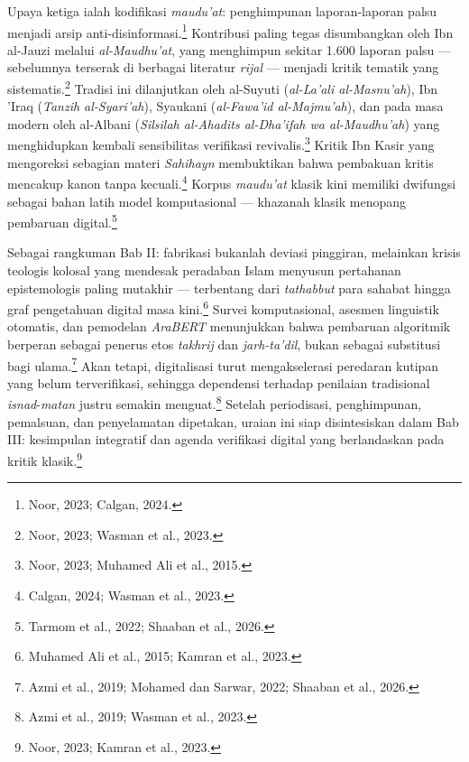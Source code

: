 Upaya ketiga ialah kodifikasi \textit{maudu'at}: penghimpunan laporan-laporan palsu menjadi arsip anti-disinformasi.\footnote{Noor, 2023; Calgan, 2024.} Kontribusi paling tegas disumbangkan oleh Ibn al-Jauzi melalui \textit{al-Maudhu'at}, yang menghimpun sekitar 1.600 laporan palsu --- sebelumnya terserak di berbagai literatur \textit{rijal} --- menjadi kritik tematik yang sistematis.\footnote{Noor, 2023; Wasman et al., 2023.} Tradisi ini dilanjutkan oleh al-Suyuti (\textit{al-La'ali al-Masnu'ah}), Ibn 'Iraq (\textit{Tanzih al-Syari'ah}), Syaukani (\textit{al-Fawa'id al-Majmu'ah}), dan pada masa modern oleh al-Albani (\textit{Silsilah al-Ahadits al-Dha'ifah wa al-Maudhu'ah}) yang menghidupkan kembali sensibilitas verifikasi revivalis.\footnote{Noor, 2023; Muhamed Ali et al., 2015.} Kritik Ibn Kasir yang mengoreksi sebagian materi \textit{Sahihayn} membuktikan bahwa pembakuan kritis mencakup kanon tanpa kecuali.\footnote{Calgan, 2024; Wasman et al., 2023.} Korpus \textit{maudu'at} klasik kini memiliki dwifungsi sebagai bahan latih model komputasional --- khazanah klasik menopang pembaruan digital.\footnote{Tarmom et al., 2022; Shaaban et al., 2026.}

Sebagai rangkuman Bab II: fabrikasi bukanlah deviasi pinggiran, melainkan krisis teologis kolosal yang mendesak peradaban Islam menyusun pertahanan epistemologis paling mutakhir --- terbentang dari \textit{tathabbut} para sahabat hingga graf pengetahuan digital masa kini.\footnote{Muhamed Ali et al., 2015; Kamran et al., 2023.} Survei komputasional, asesmen linguistik otomatis, dan pemodelan \textit{AraBERT} menunjukkan bahwa pembaruan algoritmik berperan sebagai penerus etos \textit{takhrij} dan \textit{jarh-ta'dil}, bukan sebagai substitusi bagi ulama.\footnote{Azmi et al., 2019; Mohamed dan Sarwar, 2022; Shaaban et al., 2026.} Akan tetapi, digitalisasi turut mengakselerasi peredaran kutipan yang belum terverifikasi, sehingga dependensi terhadap penilaian tradisional \textit{isnad}-\textit{matan} justru semakin menguat.\footnote{Azmi et al., 2019; Wasman et al., 2023.} Setelah periodisasi, penghimpunan, pemalsuan, dan penyelamatan dipetakan, uraian ini siap disintesiskan dalam Bab III: kesimpulan integratif dan agenda verifikasi digital yang berlandaskan pada kritik klasik.\footnote{Noor, 2023; Kamran et al., 2023.}

